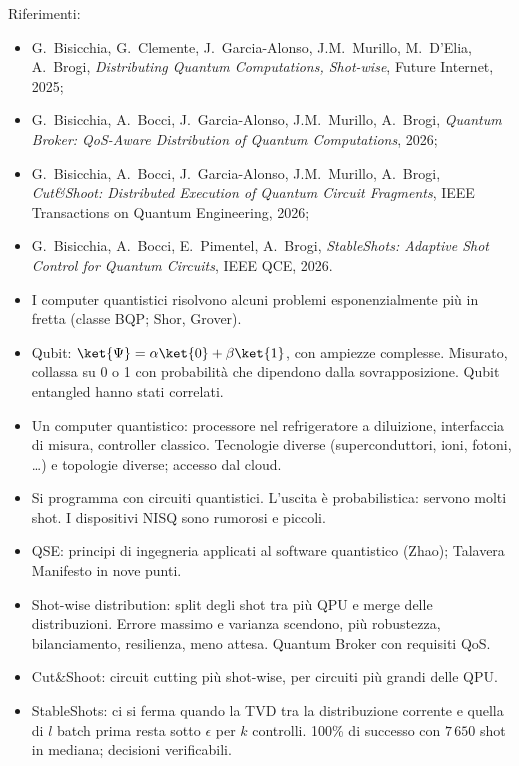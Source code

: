 Riferimenti:
\begin{itemize}
  \item G.~Bisicchia, G.~Clemente, J.~Garcia-Alonso, J.M.~Murillo, M.~D'Elia, A.~Brogi, \emph{Distributing Quantum
    Computations, Shot-wise}, Future Internet, 2025;
  \item G.~Bisicchia, A.~Bocci, J.~Garcia-Alonso, J.M.~Murillo, A.~Brogi, \emph{Quantum Broker: QoS-Aware Distribution
    of Quantum Computations}, 2026;
  \item G.~Bisicchia, A.~Bocci, J.~Garcia-Alonso, J.M.~Murillo, A.~Brogi, \emph{Cut\&Shoot: Distributed Execution of
    Quantum Circuit Fragments}, IEEE Transactions on Quantum Engineering, 2026;
  \item G.~Bisicchia, A.~Bocci, E.~Pimentel, A.~Brogi, \emph{StableShots: Adaptive Shot Control for Quantum Circuits},
    IEEE QCE, 2026.
\end{itemize}

\begin{puntichiave}
\begin{itemize}
  \item I computer quantistici risolvono alcuni problemi esponenzialmente più in fretta (classe BQP; Shor, Grover).
  \item Qubit: $\ket{\Psi} = \alpha\ket{0} + \beta\ket{1}$, con ampiezze complesse. Misurato, collassa su 0 o 1 con
    probabilità che dipendono dalla sovrapposizione. Qubit entangled hanno stati correlati.
  \item Un computer quantistico: processore nel refrigeratore a diluizione, interfaccia di misura, controller classico.
    Tecnologie diverse (superconduttori, ioni, fotoni, \ldots) e topologie diverse; accesso dal cloud.
  \item Si programma con circuiti quantistici. L'uscita è probabilistica: servono molti shot. I dispositivi NISQ sono
    rumorosi e piccoli.
  \item QSE: principi di ingegneria applicati al software quantistico (Zhao); Talavera Manifesto in nove punti.
  \item Shot-wise distribution: split degli shot tra più QPU e merge delle distribuzioni. Errore massimo e varianza
    scendono, più robustezza, bilanciamento, resilienza, meno attesa. Quantum Broker con requisiti QoS.
  \item Cut\&Shoot: circuit cutting più shot-wise, per circuiti più grandi delle QPU.
  \item StableShots: ci si ferma quando la TVD tra la distribuzione corrente e quella di $l$ batch prima resta sotto
    $\epsilon$ per $k$ controlli. 100\% di successo con $7\,650$ shot in mediana; decisioni verificabili.
\end{itemize}
\end{puntichiave}


